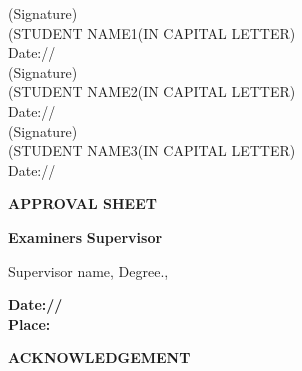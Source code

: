\documentclass[10pt]{report}
\begin{document}
\vspace{2.0cm}
\begin{flushright}
(Signature)\\
\large{(STUDENT NAME1(IN CAPITAL LETTER)}\\
\large{Date:\hspace*{1.0cm}/\hspace*{1.0cm}/}\\[2.0cm]
(Signature)\\
\large{(STUDENT NAME2(IN CAPITAL LETTER)}\\
\large{Date:\hspace*{1.0cm}/\hspace*{1.0cm}/}\\[2.0cm]
(Signature)\\
\large{(STUDENT NAME3(IN CAPITAL LETTER)}\\
\large{Date:\hspace*{1.0cm}/\hspace*{1.0cm}/}\\[2.0cm]
\end{flushright}
\newpage
\newpage
\begin{center}
\Huge\textbf{APPROVAL SHEET}\\
\vspace{1.0cm}
\end{center}
\linespread{1.5}
\vspace{4.0cm}
\begin{flushleft}
\Large \textbf{Examiners} \hfill \Large \textbf{Supervisor}\\
\end{flushleft}
\begin{flushright}
Supervisor name, Degree.,
\end{flushright}
\vspace{1.0cm}
\begin{flushleft}
\large{\textbf{Date:\hspace*{1.0cm}/\hspace*{2.0cm}/}}\\
\large{\textbf{Place:}}
\end{flushleft}
\newpage
\begin{center}
\LARGE{\textbf{ACKNOWLEDGEMENT}}\\[1cm]
\end{center}
\end{document}

